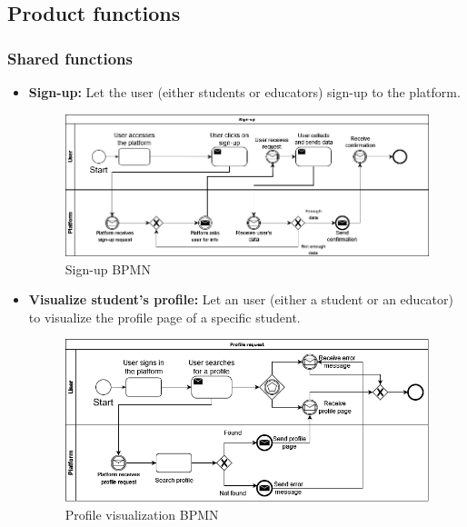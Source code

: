 \documentclass{article}
\begin{document}
{        \newpage
        
\subsection{Product functions}
    \subsubsection{Shared functions}
        \begin{itemize}
            \item \textbf{Sign-up:} Let the user (either students or educators) sign-up to the platform.
            \begin{figure}[H]
                \centering
                \includegraphics[scale=0.4]{images/BPMN/Sign_up.png}
                \caption{Sign-up BPMN}
                \label{fig:signUpBPMN}
            \end{figure}

            \item \textbf{Visualize student's profile:} Let an user (either a student or an educator) to visualize the profile page of a specific student.
            \begin{figure}[H]
                \centering
                \includegraphics[scale=0.4]{images/BPMN/Profile_request.png}
                \caption{Profile visualization BPMN}
                \label{fig:profileVisualizationBPMN}
            \end{figure}
        \end{itemize}

}
\end{document}
